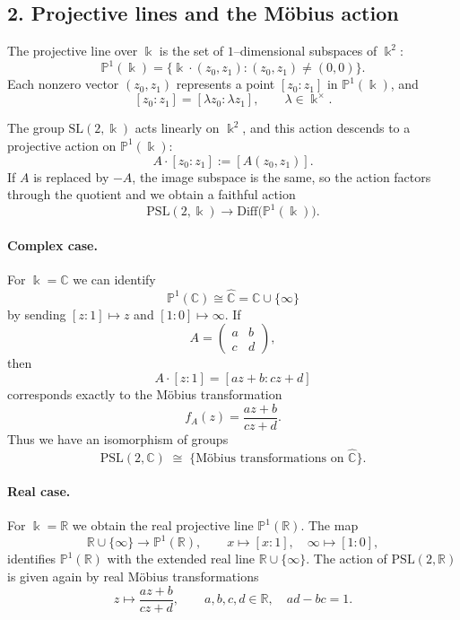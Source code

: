 \documentclass[12pt,a4paper]{article}
\theoremstyle{plain}
\theoremstyle{definition}      %
\begin{document}
\subsection*{2. Projective lines and the Möbius action}

The projective line over $\Bbbk$ is the set of $1$–dimensional subspaces of
$\Bbbk^{2}$:
\[
\mathbb{P}^{1}(\Bbbk)
= \{ \Bbbk\cdot (z_{0},z_{1}) : (z_{0},z_{1})\neq (0,0)\}.
\]
Each nonzero vector $(z_{0},z_{1})$ represents a point $[z_{0}:z_{1}]$ in
$\mathbb{P}^{1}(\Bbbk)$, and
\[
[z_{0}:z_{1}] = [\lambda z_{0}:\lambda z_{1}],\qquad \lambda\in\Bbbk^\times.
\]

The group $\mathrm{SL}(2,\Bbbk)$ acts linearly on $\Bbbk^2$, and this action
descends to a projective action on $\mathbb{P}^{1}(\Bbbk)$:
\[
A\cdot[z_{0}:z_{1}] := [A(z_{0},z_{1})].
\]
If $A$ is replaced by $-A$, the image subspace is the same, so the action
factors through the quotient and we obtain a faithful action
\[
\mathrm{PSL}(2,\Bbbk)
\longrightarrow
\mathrm{Diff}\bigl(\mathbb{P}^{1}(\Bbbk)\bigr).
\]

\paragraph{Complex case.}
For $\Bbbk=\mathbb{C}$ we can identify
\[
\mathbb{P}^{1}(\mathbb{C})
\cong \widehat{\mathbb{C}} = \mathbb{C}\cup\{\infty\}
\]
by sending $[z:1]\mapsto z$ and $[1:0]\mapsto\infty$.  If
\[
A =
\begin{pmatrix}
	a & b\\
	c & d
\end{pmatrix},
\]
then
\[
A\cdot[z:1] = [az+b:cz+d]
\]
corresponds exactly to the Möbius transformation
\[
f_A(z) = \frac{az+b}{cz+d}.
\]
Thus we have an isomorphism of groups
\[
\mathrm{PSL}(2,\mathbb{C})
\;\cong\;
\{\text{Möbius transformations on }\widehat{\mathbb{C}}\}.
\]

\paragraph{Real case.}
For $\Bbbk=\mathbb{R}$ we obtain the real projective line
$\mathbb{P}^{1}(\mathbb{R})$.  The map
\[
\mathbb{R}\cup\{\infty\} \longrightarrow \mathbb{P}^{1}(\mathbb{R}),
\qquad
x\mapsto [x:1],\quad \infty\mapsto[1:0],
\]
identifies $\mathbb{P}^{1}(\mathbb{R})$ with the extended real line
$\mathbb{R}\cup\{\infty\}$.  The action of $\mathrm{PSL}(2,\mathbb{R})$ is
given again by real Möbius transformations
\[
z\longmapsto \frac{az+b}{cz+d},
\qquad a,b,c,d\in\mathbb{R},\quad ad-bc=1.
\]
\end{document}
